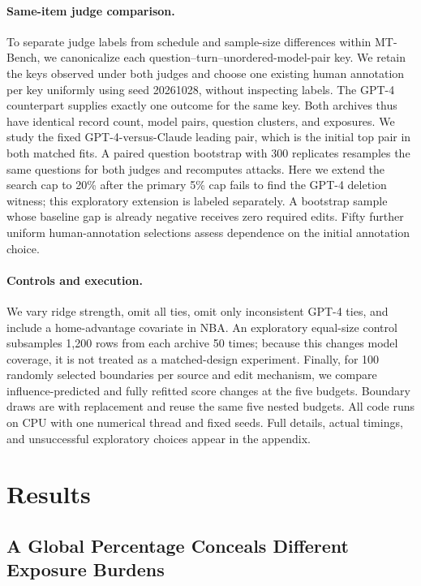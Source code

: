 \documentclass{article}
\newcommand{\NF}{\textsc{nf}}
\begin{document}
\paragraph{Same-item judge comparison.}
To separate judge labels from schedule and sample-size differences within MT-Bench, we canonicalize each question--turn--unordered-model-pair key. We retain the \MatchedN{} keys observed under both judges and choose one existing human annotation per key uniformly using seed 20261028, without inspecting labels. The GPT-4 counterpart supplies exactly one outcome for the same key. Both archives thus have identical record count, model pairs, question clusters, and exposures. We study the fixed GPT-4-versus-Claude leading pair, which is the initial top pair in both matched fits. A paired question bootstrap with 300 replicates resamples the same questions for both judges and recomputes attacks. Here we extend the search cap to 20\% after the primary 5\% cap fails to find the GPT-4 deletion witness; this exploratory extension is labeled separately. A bootstrap sample whose baseline gap is already negative receives zero required edits. Fifty further uniform human-annotation selections assess dependence on the initial annotation choice.

\paragraph{Controls and execution.}
We vary ridge strength, omit all ties, omit only inconsistent GPT-4 ties, and include a home-advantage covariate in NBA. An exploratory equal-size control subsamples 1,200 rows from each archive 50 times; because this changes model coverage, it is not treated as a matched-design experiment. Finally, for 100 randomly selected boundaries per source and edit mechanism, we compare influence-predicted and fully refitted score changes at the five budgets. Boundary draws are with replacement and reuse the same five nested budgets. All code runs on CPU with one numerical thread and fixed seeds. Full details, actual timings, and unsuccessful exploratory choices appear in the appendix.

\section{Results}
\subsection{A Global Percentage Conceals Different Exposure Burdens}
\begin{table}[t]
\caption{Found witnesses for the initial leading pair, with baseline gap uncertainty. Percentages use \emph{original} archive and union exposure. \NF{} means the prefix search found no witness within its 5\% cap; it does not certify robustness. All displayed successful witnesses were refitted.}
\label{tab:leaders}
\centering\small
\end{table}
\end{document}
